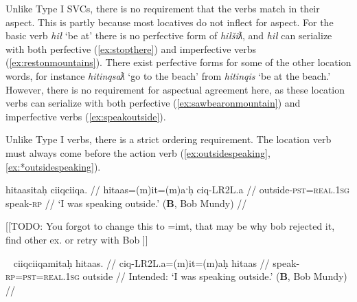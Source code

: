 \begin{comment}
This ``interruption" can occur the other way around, when the location word is intransitive.

\ex \label{ex:gasolinebydoor}
\begingl
\glpreamble ḥuqšiƛ ʔucačiƛ ḥaa yaqʔiitq hiiłsʔat̓uus gasoline.\footnotemark //
\gla ḥuq-šiƛ ʔu-ca-čiƛ ḥaa yaq=ʔiˑtq hił-L.sʔat̓uus gasoline //
\glb tip.over-\textsc{mo} \textsc{x}-go-\textsc{mo} who.what=\textsc{defn.3} be.at-by.the.door gasoline //
\glft `It knocked the gasoline over toward the door..' (\textbf{C}, \textit{tupaat} Julia Lucas) //
\endgl
\xe

\footnotetext{In this dependent construction, `gasoline' is the participant of the predicative relativizer \textit{yaq} `who'. The bracketing is [ḥuqšiƛ ʔucačiƛ]\textsubscript{pred} [ḥaa [yaqʔiitq hiiłsʔat̓uus gasoline] ]\textsubscript{part}}
\end{comment}

Unlike Type I SVCs, there is no requirement that the verbs match in their aspect. This is partly because most locatives do not inflect for aspect. For the basic verb \textit{hił} `be at' there is no perfective form of \textit{hiłšiƛ}, and \textit{hił} can serialize with both perfective (\ref{ex:stopthere}) and imperfective verbs (\ref{ex:restonmountains}). There exist perfective forms for some of the other location words, for instance \textit{hitinqsaƛ} `go to the beach' from \textit{hitinqis} `be at the beach.' However, there is no requirement for aspectual agreement here, as these location verbs can serialize with both perfective (\ref{ex:sawbearonmountain}) and imperfective verbs (\ref{ex:speakoutside}).

Unlike Type I verbs, there is a strict ordering requirement. The location verb must always come before the action verb (\ref{ex:outsidespeaking}, \ref{ex:*outsidespeaking}). 

\ex \label{ex:outsidespeaking}
\begingl
\glpreamble hitaasitaḥ ciiqciiqa. //
\gla hitaas=(m)it=(m)aˑḥ ciq-LR2L.a  //
\glb outside-\textsc{pst}=\textsc{real.1sg} speak-\textsc{rp} //
\glft `I was speaking outside.' (\textbf{B}, Bob Mundy) //
\endgl
\xe

[[TODO: You forgot to change this to =imt, that may be why bob rejected it, find other ex. or retry with Bob ]]

\ex~ \label{ex:*outsidespeaking}
\begingl
\glpreamble *ciiqciiqamitaḥ hitaas. //
\gla ciq-LR2L.a=(m)it=(m)aḥ hitaas  //
\glb speak-\textsc{rp}=\textsc{pst}=\textsc{real.1sg} outside //
\glft Intended: `I was speaking outside.' (\textbf{B}, Bob Mundy) //
\endgl
\xe


